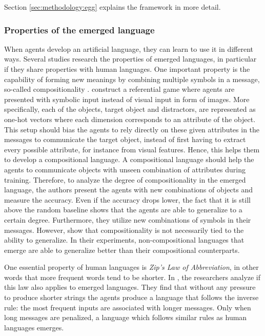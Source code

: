 Section \ref{sec:methodology:egg} explains the framework in more detail.

\subsubsection{Properties of the emerged language}
\label{sec:background:lg:properties}
When agents develop an artificial language, they can learn to use it in different ways.
Several studies research the properties of emerged languages, in particular if they share properties with human languages.
One important property is the capability of forming new meanings by combining multiple symbols in a message, so-called compositionality \citep{Chaabouni2020, Gupta2020,Kharitonov2020, Lazaridou2018}.
\citet{Lazaridou2018} construct a referential game where agents are presented with symbolic input instead of visual input in form of images.
More specifically, each of the objects, target object and distractors, are represented as one-hot vectors where each dimension corresponds to an attribute of the object.
This setup should bias the agents to rely directly on these given attributes in the messages to communicate the target object, instead of first having to extract every possible attribute, for instance  from visual features.
Hence, this helps them to develop a compositional language.
A compositional language should help the agents to communicate objects with unseen combination of attributes during training.
Therefore, to analyze the degree of compositionality in the emerged language, the authors present the agents with new combinations of objects and measure the accuracy.
Even if the accuracy drops lower, the fact that it is still above the random baseline shows that the agents are able to generalize to a certain degree.
Furthermore, they utilize new combinations of symbols in their messages.
However, \citet{Kharitonov2020} show that compositionality is not necessarily tied to the ability to generalize.
In their experiments, non-compositional languages that emerge are able to generalize better than their compositional counterparts.

One essential property of human languages is \emph{Zip's Law of Abbreviation}, in other words that more frequent words tend to be shorter.
In \citep{Chaabouni2019}, the researchers analyze if this law also applies to emerged languages.
They find that without any pressure to produce shorter strings the agents produce a language that follows the inverse rule: the most frequent inputs are associated with longer messages.
Only when long messages are penalized, a language which follows similar rules as human languages emerges.

